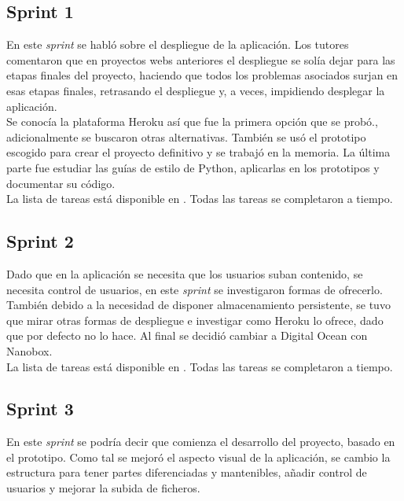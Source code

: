 \subsection{Sprint 1}
En este \textit{sprint} se habló sobre el despliegue de la aplicación. Los
tutores comentaron que en proyectos webs anteriores el despliegue se solía dejar
para las etapas finales del proyecto, haciendo que todos los problemas asociados
surjan en esas etapas finales, retrasando el despliegue y, a veces, impidiendo
desplegar la aplicación.\\

Se conocía la plataforma Heroku así que fue la primera opción que se probó., 
adicionalmente se buscaron otras alternativas. También se usó el prototipo 
escogido para crear el proyecto definitivo y se trabajó en la memoria. La 
última parte fue estudiar las guías de estilo de Python, aplicarlas en los 
prototipos y documentar su código.\\

La lista de tareas está disponible en
. Todas las tareas se completaron a tiempo.\\

\subsection{Sprint 2}
Dado que en la aplicación se necesita que los usuarios suban contenido, se
necesita control de usuarios, en este \textit{sprint} se investigaron formas de
ofrecerlo. También debido a la necesidad de disponer almacenamiento persistente,
se tuvo que mirar otras formas de despliegue e investigar como Heroku lo 
ofrece, dado que por defecto no lo hace. Al final se decidió cambiar a 
Digital Ocean con Nanobox.\\

La lista de tareas está disponible en
. Todas las tareas se completaron a tiempo.\\

\subsection{Sprint 3}
En este \textit{sprint} se podría decir que comienza el desarrollo del proyecto,
basado en el prototipo. Como tal se mejoró el aspecto visual de la aplicación,
se cambio la estructura para tener partes diferenciadas y mantenibles, añadir
control de usuarios y mejorar la subida de ficheros.\\

